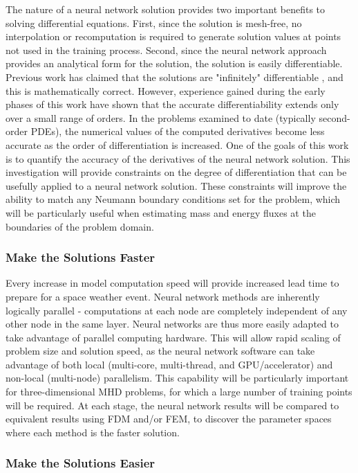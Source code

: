 \documentclass{article}
\begin{document}
The nature of a neural network solution provides two important benefits to solving differential equations. First, since the solution is mesh-free, no interpolation or recomputation is required to generate solution values at points not used in the training process. Second, since the neural network approach provides an analytical form for the solution, the solution is easily differentiable. Previous work has claimed that the solutions are "infinitely" differentiable \cite{Lagaris1998}, and this is mathematically correct. However, experience gained during the early phases of this work have shown that the accurate differentiability extends only over a small range of orders. In the problems examined to date (typically second-order PDEs), the numerical values of the computed  derivatives become less accurate as the order of differentiation is increased. One of the goals of this work is to quantify the accuracy of the derivatives of the neural network solution. This investigation will provide constraints on the degree of differentiation that can be usefully applied to a neural network solution. These constraints will improve the ability to match any Neumann boundary conditions set for the problem, which will be particularly useful when estimating mass and energy fluxes at the boundaries of the problem domain.

\subsubsection{Make the Solutions Faster}

Every increase in model computation speed will provide increased lead time to prepare for a space weather event. Neural network methods are inherently logically parallel - computations at each node are completely independent of any other node in the same layer. Neural networks are thus more easily adapted to take advantage of parallel computing hardware. This will allow rapid scaling of problem size and solution speed, as the neural network software can take advantage of both local (multi-core, multi-thread, and GPU/accelerator) and non-local (multi-node) parallelism. This capability will be particularly important for three-dimensional MHD problems, for which a large number of training points will be required. At each stage, the neural network results will be compared to equivalent results using FDM and/or FEM, to discover the parameter spaces where each method is the faster solution.

\subsubsection{Make the Solutions Easier}
\end{document}
